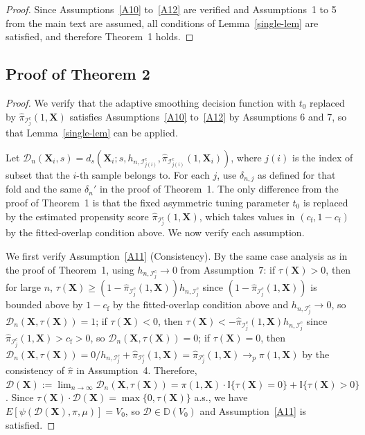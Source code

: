 \documentclass[11pt]{article}
\theoremstyle{referenceplain}
\theoremstyle{referencedefinition}
\theoremstyle{referenceremark}
\begin{document}
\begin{proof}
    Since Assumptions~\ref{A10} to~\ref{A12} are verified 
    and Assumptions~1 to 5 from the main text are 
    assumed, all conditions of Lemma~\ref{single-lem} are 
    satisfied, and therefore Theorem~1 holds.
\end{proof}

\subsection{Proof of Theorem 2}
\begin{proof}
    We verify that the adaptive smoothing decision function 
    with $t_0$ replaced by $\widehat{\pi}_{\mathcal{I}_{j}^c}
    (1,\mathbf{X})$ satisfies Assumptions~\ref{A10} 
    to~\ref{A12} by Assumptions 6 and 7, so that Lemma~\ref{single-lem} can be applied.

    Let $\mathcal{D}_n(\mathbf{X}_i,s)
    =d_{s}(\mathbf{X}_i;s,h_{n,\mathcal{I}_{j(i)}^c},
    \widehat{\pi}_{\mathcal{I}_{j(i)}^c}(1,\mathbf{X}_i))$, 
    where $j(i)$ is the index of subset that the $i$-th sample 
    belongs to. {For each $j$, use $\delta_{n,j}$ as defined for that fold and the same $\delta_n'$} 
    in the proof of Theorem~1. The only difference from the 
    proof of Theorem~1 is that the fixed asymmetric tuning 
    parameter $t_0$ is replaced by the estimated propensity 
    score $\widehat{\pi}_{\mathcal{I}_j^c}(1,\mathbf{X})$, 
    which takes values in $({c_{\mathrm f}},1-{c_{\mathrm f}})$ by the {fitted-overlap condition above}. We now verify each assumption.

    We first verify Assumption~\ref{A11} (Consistency). 
    By the same case analysis as in the proof of Theorem~1, 
    using $h_{n,\mathcal{I}_j^c}\to 0$ from Assumption~7: 
    if $\tau(\mathbf{X})>0$, then for large $n$, 
    $\tau(\mathbf{X})\ge (1-\widehat{\pi}_{\mathcal{I}_j^c}
    (1,\mathbf{X}))h_{n,\mathcal{I}_j^c}$ since 
    $(1-\widehat{\pi}_{\mathcal{I}_j^c}(1,\mathbf{X}))$ 
    is bounded above by $1-{c_{\mathrm f}}$ by {the fitted-overlap condition above} and 
    $h_{n,\mathcal{I}_j^c}\to 0$, so 
    $\mathcal{D}_n(\mathbf{X},\tau(\mathbf{X}))=1$; 
    if $\tau(\mathbf{X})<0$, then 
    $\tau(\mathbf{X})<-\widehat{\pi}_{\mathcal{I}_j^c}
    (1,\mathbf{X})h_{n,\mathcal{I}_j^c}$ since 
    $\widehat{\pi}_{\mathcal{I}_j^c}(1,\mathbf{X})>{c_{\mathrm f}}>0$, 
    so $\mathcal{D}_n(\mathbf{X},\tau(\mathbf{X}))=0$; 
    if $\tau(\mathbf{X})=0$, then 
    $\mathcal{D}_n(\mathbf{X},\tau(\mathbf{X}))
    =0/h_{n,\mathcal{I}_j^c}
    +\widehat{\pi}_{\mathcal{I}_j^c}(1,\mathbf{X})
    =\widehat{\pi}_{\mathcal{I}_j^c}(1,\mathbf{X})
    \to_p \pi(1,\mathbf{X})$ by the consistency of 
    $\widehat{\pi}$ in Assumption~4. Therefore, 
    $\mathcal{D}(\mathbf{X})
    :=\lim_{n\to\infty}\mathcal{D}_n(\mathbf{X},\tau(\mathbf{X}))
    =\pi(1,\mathbf{X})\cdot\mathbb{I}\{\tau(\mathbf{X})=0\}
    +\mathbb{I}\{\tau(\mathbf{X})>0\}$. 
    Since $\tau(\mathbf{X})\cdot\mathcal{D}(\mathbf{X})
    =\max\{0,\tau(\mathbf{X})\}$ a.s., we have 
    $E[\psi(\mathcal{D}(\mathbf{X}),\pi,\mu)]=V_0$, 
    so $\mathcal{D}\in\mathbb{D}(V_0)$ and 
    Assumption~\ref{A11} is satisfied.


\end{proof}
\end{document}
